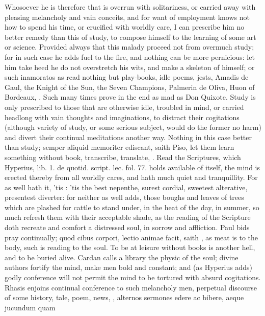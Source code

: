 {Whosoever he is therefore that is overrun with solitariness, or carried
away with pleasing melancholy and vain conceits, and for want of
employment knows not how to spend his time, or crucified with worldly
care, I can prescribe him no better remedy than this of study, to
compose himself to the learning of some art or science. Provided always
that this malady proceed not from overmuch study; for in such case he
adds fuel to the fire, and nothing can be more pernicious: let him take
heed he do not overstretch his wits, and make a skeleton of himself; or
such inamoratos as read nothing but play-books, idle poems, jests,
Amadis de Gaul, the Knight of the Sun, the Seven Champions, Palmerin de
Oliva, Huon of Bordeaux, \etc{}. Such many times prove in the end as mad as
Don Quixote. Study is only prescribed to those that are otherwise idle,
troubled in mind, or carried headlong with vain thoughts and
imaginations, to distract their cogitations (although variety of study,
or some serious subject, would do the former no harm) and divert their
continual meditations another way. Nothing in this case better than
study; semper aliquid memoriter ediscant, saith Piso, let them learn
something without book, transcribe, translate, \etc{}. Read the Scriptures,
which Hyperius, lib. 1. de quotid. script. lec. fol. 77. holds
available of itself, the mind is erected thereby from all worldly
cares, and hath much quiet and tranquillity. For as \Austin{} well
hath it, 'tis : 'tis the best nepenthe, surest cordial,
sweetest alterative, presentest diverter: for neither as
\Chrysostom well adds, those boughs and leaves of trees which are
plashed for cattle to stand under, in the heat of the day, in summer,
so much refresh them with their acceptable shade, as the reading of the
Scripture doth recreate and comfort a distressed soul, in sorrow and
affliction. Paul bids pray continually; quod cibus corpori, lectio
animae facit, saith \Seneca, as meat is to the body, such is reading to
the soul. To be at leisure without books is another hell, and to
be buried alive. Cardan calls a library the physic of the soul;
divine authors fortify the mind, make men bold and constant; and
(as Hyperius adds) godly conference will not permit the mind to be
tortured with absurd cogitations. Rhasis enjoins continual conference
to such melancholy men, perpetual discourse of some history, tale,
poem, news, \etc{}, alternos sermones edere ac bibere, aeque jucundum quam
}
